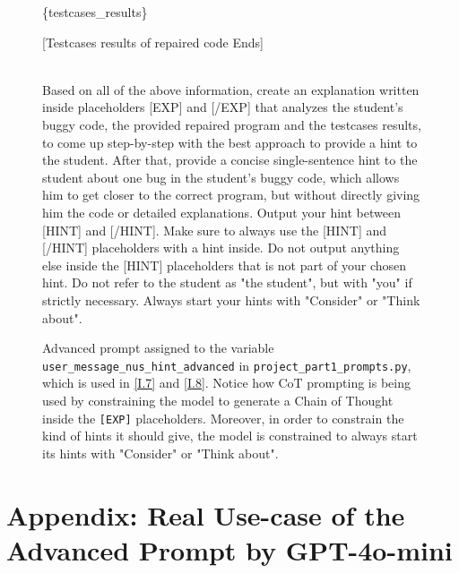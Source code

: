 \documentclass{article}
\begin{document}
\begin{figure*}[h!]
\begin{tcolorbox}[colframe=black!10!white, colback=black!5!white]
\begin{minipage}{\textwidth}
            \{testcases\_results\}

            [Testcases results of repaired code Ends]

            \texttt{\\}
            Based on all of the above information, create an explanation written inside placeholders [EXP] and [/EXP] that analyzes the student's buggy code, the provided repaired program and the testcases results, to come up step-by-step with the best approach to provide a hint to the student. After that, provide a concise single-sentence hint to the student about one bug in the student's buggy code, which allows him to get closer to the correct program, but without directly giving him the code or detailed explanations. Output your hint between [HINT] and [/HINT]. Make sure to always use the [HINT] and [/HINT] placeholders with a hint inside. Do not output anything else inside the [HINT] placeholders that is not part of your chosen hint. Do not refer to the student as "the student", but with "you" if strictly necessary. Always start your hints with "Consider" or "Think about".
        \end{minipage}
    \end{tcolorbox}
    \caption{Advanced prompt assigned to the variable \texttt{user\_message\_nus\_hint\_advanced} in \texttt{project\_part1\_prompts.py}, which is used in \ref{I.7} and \ref{I.8}. Notice how CoT prompting is being used by constraining the model to generate a Chain of Thought inside the \texttt{[EXP]} placeholders. Moreover, in order to constrain the kind of hints it should give, the model is constrained to always start its hints with "Consider" or "Think about".}
    \label{fig:advanced-prompt}
\end{figure*}

\clearpage 

\section{Appendix: Real Use-case of the Advanced Prompt by GPT-4o-mini}\label{appendix:real-use-case-gpt4o-mini}
\end{document}
